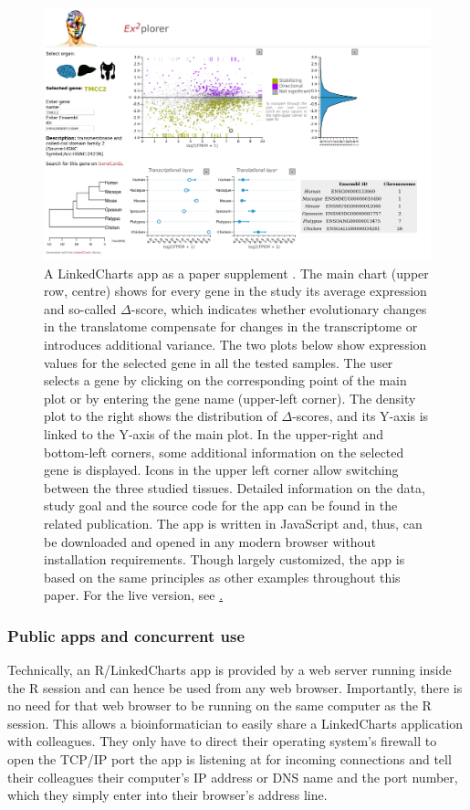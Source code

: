 \documentclass[twocolumn,10pt]{article}
\begin{document}
\begin{figure}[t]
   \includegraphics[width=\textwidth]{FigF/figF.png}
   \caption{A LinkedCharts app as a paper supplement \cite{wang_2020}. The main chart (upper row, centre) shows for every gene in the study its average expression and so-called $\Delta$-score, which indicates whether evolutionary changes in the translatome compensate for changes in the transcriptome or introduces additional variance. The two plots below show expression values for the selected gene in all the tested samples. The user selects a gene by clicking on the corresponding point of the main plot or by entering the gene name (upper-left corner). The density plot to the right shows the distribution of $\Delta$-scores, and its Y-axis is linked to the Y-axis of the main plot. In the upper-right and bottom-left corners, some additional information on the selected gene is displayed. Icons in the upper left corner allow switching between the three studied tissues. Detailed information on the data, study goal and the source code for the app can be found in the related publication. The app is written in JavaScript and, thus, can be downloaded and opened in any modern browser without installation requirements. Though largely customized, the app is based on the same principles as other examples throughout this paper. For the live version, see \href{https://ex2plorer.kaessmannlab.org/}.}
   \label{FigF}
\end{figure}

\subsubsection{Public apps and concurrent use}

Technically, an R/LinkedCharts app is provided by a web server running inside the R session and can hence be used from any web browser. Importantly, there is no need for that web browser to be running on the same computer as the R session. This allows a bioinformatician to easily share a LinkedCharts application with colleagues. They only have to direct their operating system's firewall to open the TCP/IP port the app is listening at for incoming connections and tell their colleagues their computer's IP address or DNS name and the port number, which they simply enter into their browser's address line.
\end{document}
